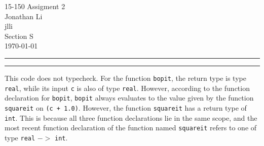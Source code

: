 \documentclass[11pt]{article}
\newcounter{questionCounter}
\newcounter{partCounter}[questionCounter]
\newenvironment{question}[2][\arabic{questionCounter}]{%
    \setcounter{partCounter}{0}%
    \vspace{.25in} \hrule \vspace{0.5em}%
        \noindent{\bf #2}%
    \vspace{0.8em} \hrule \vspace{.10in}%
    \addtocounter{questionCounter}{1}%
}{}
\newcommand{\myclass}{15-150}
\newcommand{\myname}{Jonathan Li}
\newcommand{\myandrew}{jlli}
\newcommand{\myhwname}{Assigment 2}
\newcommand{\myrecitation}{Section S}
\begin{document}
\thispagestyle{plain}

\begin{center}
{\Large \myclass{} \myhwname} \\
\myname \\
\myandrew \\
\myrecitation \\
\today
\end{center}

\begin{question}{Task 2.1}
This code does not typecheck. For the function \verb!bopit!, the return type is type \verb!real!, while its input \verb!c! is also of type \verb!real!. However, according to the function declaration for \verb!bopit!, \verb!bopit! always evaluates to the value given by the function \verb!squareit! on \verb!(c + 1.0)!. However, the function \verb!squareit! has a return type of \verb!int!. This is because all three function declarations lie in the same scope, and the most recent function declaration of the function named \verb!squareit! refers to one of type \verb!real! $->$ \verb!int!.
\end{question}
\end{document}
